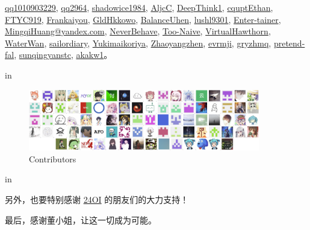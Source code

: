 \href{https://github.com/qq1010903229}{qq1010903229}, \href{https://github.com/qq2964}{qq2964}, \href{https://github.com/shadowice1984}{shadowice1984}, \href{https://github.com/AljcC}{AljcC}, \href{https://github.com/DeepThink1}{DeepThink1}, \href{https://github.com/cquptEthan}{cquptEthan}, \href{https://github.com/FTYC919}{FTYC919}, \href{https://github.com/Frankaiyou}{Frankaiyou}, \href{https://github.com/GldHkkowo}{GldHkkowo}, \href{https://github.com/BalanceUhen}{BalanceUhen}, \href{https://github.com/lushl9301}{lushl9301}, \href{https://github.com/Enter-tainer}{Enter-tainer}, \href{mailto:mingqihuang@yandex.com}{MingqiHuang@yandex.com}, \href{https://github.com/NeverBehave}{NeverBehave}, \href{https://github.com/Too-Naive}{Too-Naive}, \href{https://github.com/VirtualHawthorn}{VirtualHawthorn}, \href{https://github.com/WaterWan}{WaterWan}, \href{https://github.com/sailordiary}{sailordiary}, \href{mailto:qiu-88@qq.com}{Yukimaikoriya}, \href{https://github.com/Zhaoyangzhen}{Zhaoyangzhen}, \href{https://github.com/evrmji}{evrmji}, \href{mailto:gryzhmq@hmq011212@163.com}{gryzhmq}, \href{https://github.com/pretend-fal}{pretend-fal}, \href{https://github.com/sunqingyanstc}{sunqingyanstc}, \href{https://github.com/akakw1}{akakw1}。


 in
\begin{figure}[htbp]
  \centering
  \includegraphics[width=0.9\textwidth]{contributors.png} 
  \caption{Contributors}
\end{figure}
 in

另外，也要特别感谢 \href{https://github.com/24OI}{24OI} 的朋友们的大力支持！

最后，感谢董小姐，让这一切成为可能。

